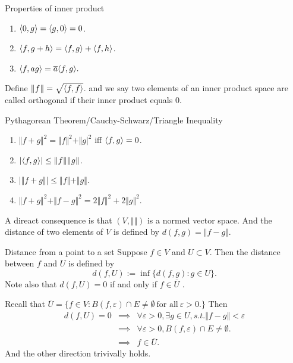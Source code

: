 \begin{stheorem}{Properties of inner product}{}
	\begin{enumerate}
		\item ${\langle 0,g\rangle} = {\langle g,0\rangle}=0$.
		\item ${\langle f,g+h\rangle}={\langle f,g\rangle}+{\langle f,h\rangle}$.
		\item ${\langle f,ag\rangle}=\overline{a}{\langle f,g\rangle}.$
	\end{enumerate}
\end{stheorem}
Define $\Vert f\Vert = \sqrt{{\langle f,f\rangle}}$. and we say two elements of an inner product space are called orthogonal if their inner product equals 0.
\begin{stheorem}{Pythagorean Theorem/Cauchy-Schwarz/Triangle Inequality}{}
\begin{enumerate}
	\item $\Vert f+g \Vert^2=\Vert f\Vert^2 + \Vert g \vert^2$ iff ${\langle f,g\rangle}=0$.
	\item $|{\langle f,g\rangle}|\leq \Vert f \Vert \Vert g \Vert$. 
	\item $|\Vert f+g \Vert |\leq \Vert f\Vert + \Vert g \Vert$.
	\item $\Vert f+g \Vert^2+\Vert f-g \Vert^2=2\Vert f\Vert^2 + 2\Vert g \Vert^2$.   
\end{enumerate}
\end{stheorem}
A direact consequence is that $(V,\Vert \Vert)$ is a normed vector space. And the distance of two elements of $V$ is defined by $d(f,g)=\Vert f-g\Vert$. 

\begin{sdefinition}{Distance from a point to a set}{}
Suppose $f\in V$ and $U \subset V$. Then the distance between $f$ and $U$ is defined by
$$
d(f,U) := \inf\{d(f,g): g\in U \}. 
$$
Note also that $d(f,U)=0$ if and only if $f\in \overline{U}$	.
\end{sdefinition}
\begin{Proof} Recall that $\overline U =\{f\in V: B(f,\varepsilon)\cap E \neq \emptyset \ \text{for all} \ \varepsilon >0.\}$
Then
\begin{eqnarray*}
	d(f,U)=0 &\implies & \forall \varepsilon >0 ,\exists g\in U, s.t. \Vert f-g\Vert < \varepsilon \\
	& \implies & \forall \varepsilon >0, B(f,\varepsilon)\cap E\neq \emptyset. \\
	& \implies & f \in \overline U.
\end{eqnarray*}
And the other direction trivivally holds. 
\end{Proof}

